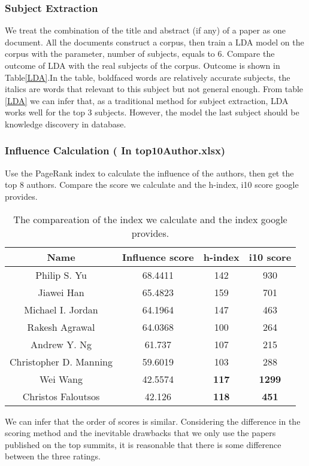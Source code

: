 \documentclass[conference]{IEEEtran}
\begin{document}
\subsubsection{Subject Extraction}
We treat the combination of the title and abstract (if any) of a paper as one document. All the documents construct a corpus, then train a LDA model on the corpus with the parameter, number of subjects, equals to 6. Compare the outcome of LDA with the real subjects of the corpus. Outcome  is shown in Table\ref{LDA}.In the table, boldfaced words
  are relatively accurate subjects, the italics are words that relevant
  to this subject but not general enough.
  From table \ref{LDA} we can infer that, as a traditional method for subject extraction, LDA works well for the top 3 subjects. However, the model the last subject should be knowledge discovery in database.
 \subsubsection{Influence Calculation ( In top10Author.xlsx)}
 Use the PageRank index to calculate the influence of the authors, then get the top 8 authors. Compare the score we calculate and the h-index, i10 score google provides. 
 \begin{table}[h]
\center
	\begin{tabular}{c|c|c|c}	
  \hline
  Name & Influence score & h-index & i10 score\\
  \hline
  \hline
  Philip S. Yu & 68.4411 & 142 & 930\\
  \hline
  Jiawei Han & 65.4823 & 159 & 701\\
  \hline
  Michael I. Jordan & 64.1964 & 147 & 463\\
  \hline
  Rakesh Agrawal & 64.0368 & 100 & 264\\
  \hline
  Andrew Y. Ng & 61.737 & 107 & 215\\
  \hline
  Christopher D. Manning & 59.6019 & 103 & 288\\
  \hline
  Wei Wang & 42.5574 & \textbf{117} & \textbf{1299}\\
  \hline
  Christos Faloutsos & 42.126 & \textbf{118} &
  \textbf{451}\\
  \hline
\end{tabular}
\caption{The compareation of the index we calculate and the index google provides.}
  \end{table}
  We can infer that the order of scores is similar. Considering the difference in the scoring method and the inevitable drawbacks that we only use the papers published on the top summits, it is reasonable that there is some difference between the three ratings.
\end{document}
